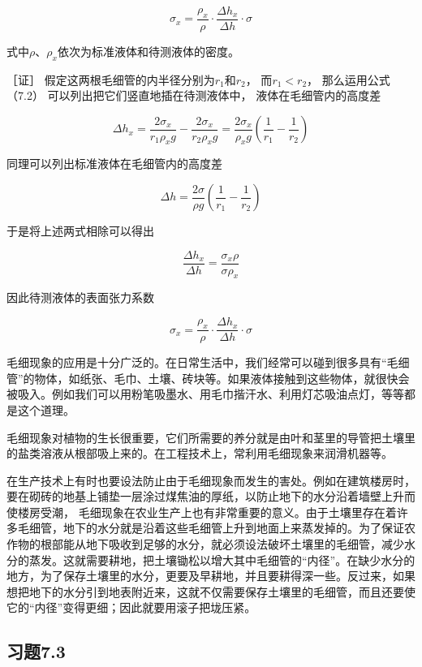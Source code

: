 \[
\sigma_ {x} = \frac {\rho_ {x}}{\rho} \cdot \frac {\Delta h _ {x}}{\Delta h} \cdot \sigma
\]

式中\(\rho\)、\(\rho_{x}\)依次为标准液体和待测液体的密度。

［证］ 假定这两根毛细管的内半径分别为\(r_1\)和\(r_2\)，
而\(r_1 < r_2\)， 那么运用公式 （7.2）
可以列出把它们竖直地插在待测液体中， 液体在毛细管内的高度差

\[
\Delta h _ {x} = \frac {2 \sigma_ {x}}{r _ {1} \rho_ {x} g} - \frac {2 \sigma_ {x}}{r _ {2} \rho_ {x} g} = \frac {2 \sigma_ {x}}{\rho_ {x} g} \left(\frac {1}{r _ {1}} - \frac {1}{r _ {2}}\right)
\]

同理可以列出标准液体在毛细管内的高度差

\[
\Delta h = \frac {2 \sigma}{\rho g} \left(\frac {1}{r _ {1}} - \frac {1}{r _ {2}}\right)
\]

于是将上述两式相除可以得出

\[
\frac {\Delta h _ {x}}{\Delta h} = \frac {\sigma_ {x} \rho}{\sigma \rho_ {x}}
\]

因此待测液体的表面张力系数

\[
\sigma_ {x} = \frac {\rho_ {x}}{\rho} \cdot \frac {\Delta h _ {x}}{\Delta h} \cdot \sigma
\]

毛细现象的应用是十分广泛的。在日常生活中，我们经常可以碰到很多具有``毛细管''的物体，如纸张、毛巾、土壤、砖块等。如果液体接触到这些物体，就很快会被吸入。例如我们可以用粉笔吸墨水、用毛巾揩汗水、利用灯芯吸油点灯，等等都是这个道理。

毛细现象对植物的生长很重要，它们所需要的养分就是由叶和茎里的导管把土壤里的盐类溶液从根部吸上来的。在工程技术上，常利用毛细现象来润滑机器等。

在生产技术上有时也要设法防止由于毛细现象而发生的害处。例如在建筑楼房时，要在砌砖的地基上铺垫一层涂过煤焦油的厚纸，以防止地下的水分沿着墙壁上升而使楼房受潮，
毛细现象在农业生产上也有非常重要的意义。由于土壤里存在着许多毛细管，地下的水分就是沿着这些毛细管上升到地面上来蒸发掉的。为了保证农作物的根部能从地下吸收到足够的水分，就必须设法破坏土壤里的毛细管，减少水分的蒸发。这就需要耕地，把土壤锄松以增大其中毛细管的``内径''。在缺少水分的地方，为了保存土壤里的水分，更要及早耕地，并且要耕得深一些。反过来，如果想把地下的水分引到地表附近来，这就不仅需要保存土壤里的毛细管，而且还要使它的``内径''变得更细；因此就要用滚子把垅压紧。

\subsection{习题7.3}\label{ux4e60ux98987.3}

